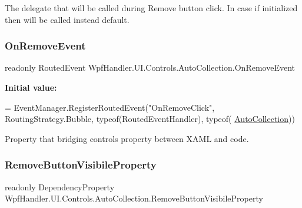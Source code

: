 The delegate that will be called during Remove button click. In case if initialized then will be called instead default. 

\mbox{\label{class_wpf_handler_1_1_u_i_1_1_controls_1_1_auto_collection_a55213a701b1defa4c6a490d25f083fe4}} 
\subsubsection{\texorpdfstring{On\+Remove\+Event}{OnRemoveEvent}}
{\footnotesize\ttfamily readonly Routed\+Event Wpf\+Handler.\+U\+I.\+Controls.\+Auto\+Collection.\+On\+Remove\+Event\hspace{0.3cm}{\ttfamily [static]}}

{\bfseries Initial value\+:}
\begin{DoxyCode}
= EventManager.RegisterRoutedEvent(\textcolor{stringliteral}{"OnRemoveClick"},
            RoutingStrategy.Bubble, typeof(RoutedEventHandler), typeof(
      \mbox{\hyperlink{class_wpf_handler_1_1_u_i_1_1_controls_1_1_auto_collection_a8bc71a7c43dfeca1d6ff113b12088c28}{AutoCollection}}))
\end{DoxyCode}


Property that bridging control\textquotesingle{}s property between X\+A\+ML and code. 

\mbox{\label{class_wpf_handler_1_1_u_i_1_1_controls_1_1_auto_collection_a85a427be17693babbaa5943c04c2ca2d}} 
\subsubsection{\texorpdfstring{Remove\+Button\+Visibile\+Property}{RemoveButtonVisibileProperty}}
{\footnotesize\ttfamily readonly Dependency\+Property Wpf\+Handler.\+U\+I.\+Controls.\+Auto\+Collection.\+Remove\+Button\+Visibile\+Property\hspace{0.3cm}{\ttfamily [static]}}

